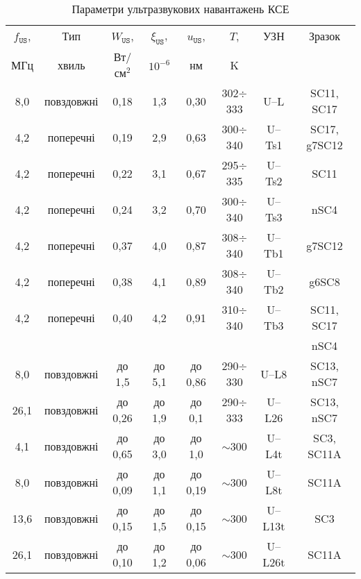 \begin{table}
\caption{\label{tabUSL}Параметри ультразвукових навантажень КСЕ
}
\begin{tabular}{|c|c|c|c|c|c|c|c|}
\hline
$f_\mathtt{US}$,&Тип&$W_{\mathtt{US}}$,&$\xi_{\mathtt{US}}$,&$u_{\mathtt{US}}$,&$T$,&УЗН&Зразок\\
МГц&хвиль&Вт/см$^2$&$10^{-6}$&нм&K&&\\
\hline
8,0&повздовжні&0,18&1,3&0,30&302$\div$333&U--L&SC11, SC17\\ \hline
4,2&поперечні&0,19&2,9&0,63&300$\div$340&U--Ts1&SC17, g7SC12\\ \hline
4,2&поперечні&0,22&3,1&0,67&295$\div$335&U--Ts2&SC11\\ \hline
4,2&поперечні&0,24&3,2&0,70&300$\div$340&U--Ts3&nSC4\\ \hline
4,2&поперечні&0,37&4,0&0,87&308$\div$340&U--Tb1&g7SC12\\ \hline
4,2&поперечні&0,38&4,1&0,89&308$\div$340&U--Tb2&g6SC8\\ \hline
4,2&поперечні&0,40&4,2&0,91&310$\div$340&U--Tb3&SC11, SC17\\
&&&&&&&nSC4\\ \hline
8,0&повздовжні&до 1,5&до 5,1&до 0,86&290$\div$330&U--L8&SC13, nSC7\\ \hline
26,1&повздовжні&до 0,26&до 1,9&до 0,1&290$\div$333&U--L26&SC13, nSC7\\ \hline
4,1&повздовжні&до 0,65&до 3,0&до 1,0&$\sim$300&U--L4t&SC3, SC11A\\ \hline
8,0&повздовжні&до 0,09&до 1,1&до 0,19&$\sim$300&U--L8t&SC11A\\ \hline
13,6&повздовжні&до 0,15&до 1,5&до 0,15&$\sim$300&U--L13t&SC3\\ \hline
26,1&повздовжні&до 0,10&до 1,2&до 0,06&$\sim$300&U--L26t& SC11A\\ \hline
\end{tabular}
\end{table}




